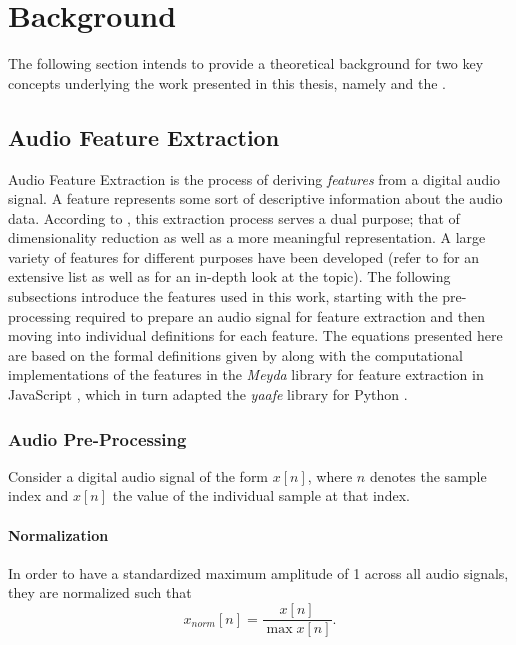 
\section{Background}
\label{sec:background}
The following section intends to provide a theoretical background for two key
concepts underlying the work presented in this thesis, namely
 and the .

\subsection{Audio Feature Extraction}
\label{subsec:feature_extraction}
Audio Feature Extraction is the process of deriving \textit{features} from a
digital audio signal. A feature represents some sort of descriptive information
about the audio data. According to \citet{lerch2012}, this extraction process
serves a dual purpose; that of dimensionality reduction as well as a more
meaningful representation. A large variety of features for different purposes
have been developed (refer to \citet{peeters2004} for an extensive list as well
as \citet{lerch2012} for an in-depth look at the topic). The following
subsections introduce the features used in this work, starting with the pre-processing required to prepare an audio signal for feature extraction and then
moving into individual definitions for each feature. The equations presented
here are based on the formal definitions given by \citet{lerch2012} along with
the computational implementations of the features in the \textit{Meyda} library
for feature extraction in JavaScript \citep{rawlinson2015}, which in turn
adapted the \textit{yaafe} library for Python \citep{mathieu2010}.

\subsubsection{Audio Pre-Processing}
\label{subsubsec:preprocessing}
Consider a digital audio signal of the form $x[n]$, where $n$ denotes the sample
index and $x[n]$ the value of the individual sample at that index.

\paragraph{Normalization}
\label{para:normalization}
In order to have a standardized maximum amplitude of 1 across all audio signals,
they are normalized such that
\begin{equation}
  x_{norm}[n] = \frac{x[n]}{\max{x[n]}}.
\end{equation}

